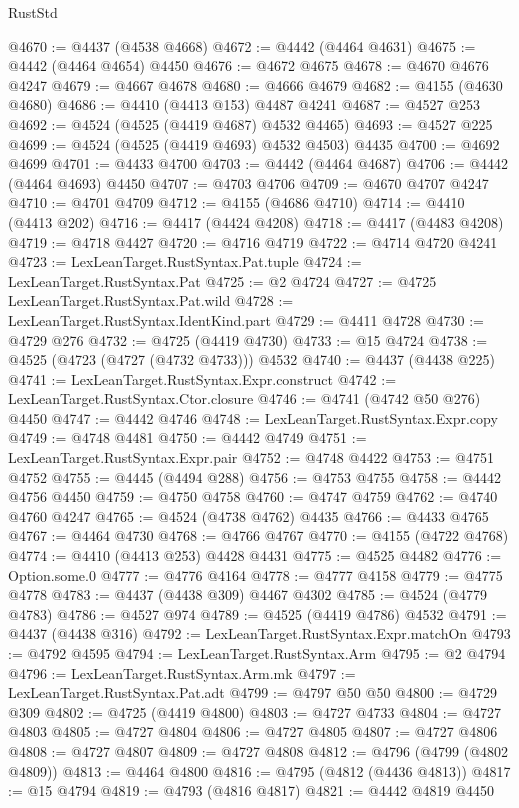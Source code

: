 \begin{lexlean}{RustStd}
\begin{coremodule}
@4670 := @4437 (@4538 @4668)
@4672 := @4442 (@4464 @4631)
@4675 := @4442 (@4464 @4654) @4450
@4676 := @4672 @4675
@4678 := @4670 @4676 @4247
@4679 := @4667 @4678
@4680 := @4666 @4679
@4682 := @4155 (@4630 @4680)
@4686 := @4410 (@4413 @153) @4487 @4241
@4687 := @4527 @253
@4692 := @4524 (@4525 (@4419 @4687) @4532 @4465)
@4693 := @4527 @225
@4699 := @4524 (@4525 (@4419 @4693) @4532 @4503) @4435
@4700 := @4692 @4699
@4701 := @4433 @4700
@4703 := @4442 (@4464 @4687)
@4706 := @4442 (@4464 @4693) @4450
@4707 := @4703 @4706
@4709 := @4670 @4707 @4247
@4710 := @4701 @4709
@4712 := @4155 (@4686 @4710)
@4714 := @4410 (@4413 @202)
@4716 := @4417 (@4424 @4208)
@4718 := @4417 (@4483 @4208)
@4719 := @4718 @4427
@4720 := @4716 @4719
@4722 := @4714 @4720 @4241
@4723 := LexLeanTarget.RustSyntax.Pat.tuple
@4724 := LexLeanTarget.RustSyntax.Pat
@4725 := @2 @4724
@4727 := @4725 LexLeanTarget.RustSyntax.Pat.wild
@4728 := LexLeanTarget.RustSyntax.IdentKind.part
@4729 := @4411 @4728
@4730 := @4729 @276
@4732 := @4725 (@4419 @4730)
@4733 := @15 @4724
@4738 := @4525 (@4723 (@4727 (@4732 @4733))) @4532
@4740 := @4437 (@4438 @225)
@4741 := LexLeanTarget.RustSyntax.Expr.construct
@4742 := LexLeanTarget.RustSyntax.Ctor.closure
@4746 := @4741 (@4742 @50 @276) @4450
@4747 := @4442 @4746
@4748 := LexLeanTarget.RustSyntax.Expr.copy
@4749 := @4748 @4481
@4750 := @4442 @4749
@4751 := LexLeanTarget.RustSyntax.Expr.pair
@4752 := @4748 @4422
@4753 := @4751 @4752
@4755 := @4445 (@4494 @288)
@4756 := @4753 @4755
@4758 := @4442 @4756 @4450
@4759 := @4750 @4758
@4760 := @4747 @4759
@4762 := @4740 @4760 @4247
@4765 := @4524 (@4738 @4762) @4435
@4766 := @4433 @4765
@4767 := @4464 @4730
@4768 := @4766 @4767
@4770 := @4155 (@4722 @4768)
@4774 := @4410 (@4413 @253) @4428 @4431
@4775 := @4525 @4482
@4776 := Option.some.{0}
@4777 := @4776 @4164
@4778 := @4777 @4158
@4779 := @4775 @4778
@4783 := @4437 (@4438 @309) @4467 @4302
@4785 := @4524 (@4779 @4783)
@4786 := @4527 @974
@4789 := @4525 (@4419 @4786) @4532
@4791 := @4437 (@4438 @316)
@4792 := LexLeanTarget.RustSyntax.Expr.matchOn
@4793 := @4792 @4595
@4794 := LexLeanTarget.RustSyntax.Arm
@4795 := @2 @4794
@4796 := LexLeanTarget.RustSyntax.Arm.mk
@4797 := LexLeanTarget.RustSyntax.Pat.adt
@4799 := @4797 @50 @50
@4800 := @4729 @309
@4802 := @4725 (@4419 @4800)
@4803 := @4727 @4733
@4804 := @4727 @4803
@4805 := @4727 @4804
@4806 := @4727 @4805
@4807 := @4727 @4806
@4808 := @4727 @4807
@4809 := @4727 @4808
@4812 := @4796 (@4799 (@4802 @4809))
@4813 := @4464 @4800
@4816 := @4795 (@4812 (@4436 @4813))
@4817 := @15 @4794
@4819 := @4793 (@4816 @4817)
@4821 := @4442 @4819 @4450

\end{coremodule}
\end{lexlean}
